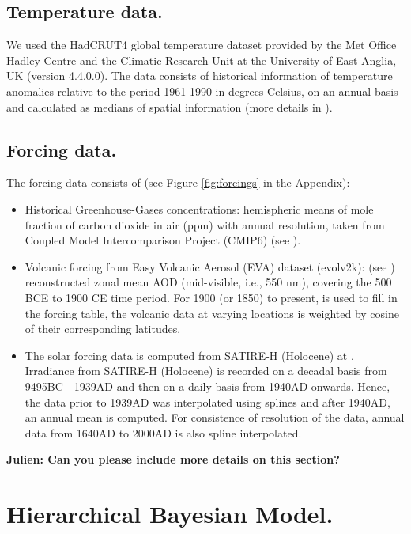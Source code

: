 \documentclass[11pt]{amsart}
\theoremstyle{plain}
\theoremstyle{definition}
\theoremstyle{remark}
\begin{document}
\subsection{Temperature data.}
We used the HadCRUT4 global temperature dataset provided by the Met Office Hadley
Centre and the Climatic Research Unit at the University of East Anglia, UK (version 4.4.0.0). The
data consists of historical information of temperature anomalies relative to the
period 1961-1990 in degrees Celsius, on an annual basis and calculated as
medians of spatial information (more details in \cite{Morice2012}).

\subsection{Forcing data.}
The forcing data consists of (see Figure \ref{fig:forcings} in the Appendix):
\begin{itemize}
\item Historical Greenhouse-Gases concentrations: hemispheric means of mole
  fraction of carbon dioxide in air (ppm) with annual
  resolution, taken from Coupled Model Intercomparison Project (CMIP6) (see
  \cite{Meinshausen2016}).
  
\item Volcanic forcing from Easy Volcanic Aerosol (EVA) dataset (evolv2k): (see
  \cite{Toohey2016}) reconstructed zonal mean AOD (mid-visible, i.e., 550 nm), covering the
  500 BCE to 1900 CE time period. For 1900 (or 1850) to present, \cite{Thomason2016} is
  used to fill in the forcing table, the volcanic data at varying locations is
  weighted by cosine of their corresponding latitudes.
  
\item The solar forcing data is computed from SATIRE-H
  (Holocene) at \cite{Vieira2011}. Irradiance from SATIRE-H (Holocene) is
  recorded on a decadal basis from 9495BC - 1939AD and then on a daily basis
  from 1940AD onwards. Hence, the data prior to 1939AD was interpolated using splines and after 1940AD, an annual mean is computed. For consistence of resolution of the data, annual data from 1640AD to 2000AD is also spline interpolated.
\end{itemize}
\textbf{Julien: Can you please include more details on this section?}
\section{Hierarchical Bayesian Model.}
\label{sec:model}
\end{document}
